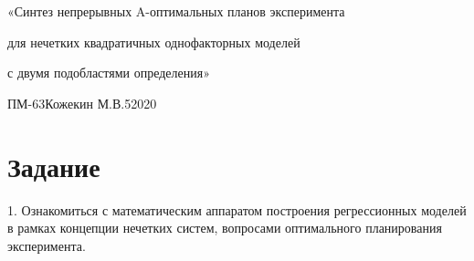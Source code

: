 ﻿%

\newcommand{\rb}[1]{ \left( #1 \right) }

\newcommand{\sqbr}[1]{ \left[ #1 \right]}

\newcommand{\InsertImage}[2]
{
    \begin{center}
        \texttt{[image: \#2]}        
    \end{center}
}

\newcommand{\InsertTwoImages}[3]
{
    \begin{center}
        \texttt{[image: \#2]}
        \texttt{[image: \#3]}
    \end{center}
}

\newcommand{\InsertFourImages}[5]
{
    \begin{center}
        \texttt{[image: \#2]}
        \texttt{[image: \#3]}
    \end{center}
    \begin{center}
        \texttt{[image: \#4]}
        \texttt{[image: \#5]}
    \end{center}
}


{«Синтез  непрерывных A-оптимальных  планов  эксперимента

для  нечетких квадратичных однофакторных моделей

с двумя подобластями определения»}
{ПМ-63}{Кожекин М.В.}{5}{2020}


\section{Задание}

1. Ознакомиться с математическим аппаратом построения регрессионных моделей в рамках
концепции нечетких систем, вопросами оптимального планирования эксперимента.

